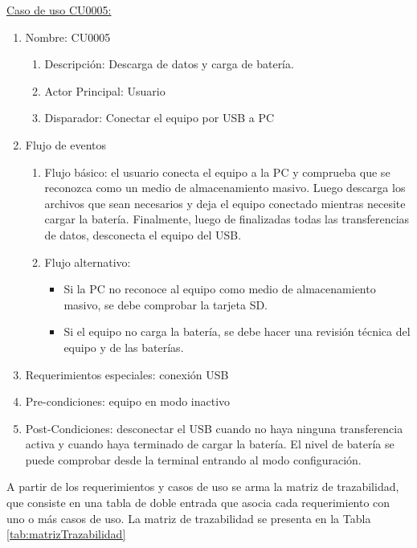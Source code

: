 	\underline{Caso de uso CU0005:}

	\begin{enumerate} 
		\item Nombre: CU0005
		\begin{enumerate} [label*=\arabic*.]
			\item Descripción: Descarga de datos y carga de batería.
			\item Actor Principal: Usuario
			\item Disparador: Conectar el equipo por USB a PC
		\end{enumerate}
		\item Flujo de eventos
		\begin{enumerate} [label*=\arabic*.]
			\item Flujo básico: el usuario conecta el equipo a la PC y comprueba que se reconozca como un medio de almacenamiento masivo. Luego descarga los archivos que sean necesarios y deja el equipo conectado mientras necesite cargar la batería. Finalmente, luego de finalizadas todas las transferencias de datos, desconecta el equipo del USB.
			\item Flujo alternativo:
			\begin{itemize}
				\item Si la PC no reconoce al equipo como medio de almacenamiento masivo, se debe comprobar la tarjeta SD.
				\item Si el equipo no carga la batería, se debe hacer una revisión técnica del equipo y de las baterías.			
			\end{itemize}				
		\end{enumerate}

		\item Requerimientos especiales: conexión USB
		\item Pre-condiciones: equipo en modo inactivo
		\item Post-Condiciones: desconectar el USB cuando no haya ninguna transferencia activa y cuando haya terminado de cargar la batería. El nivel de batería se puede comprobar desde la terminal entrando al modo configuración.
	\end{enumerate}
	
A partir de los requerimientos y casos de uso se arma la matriz de trazabilidad, que consiste en una tabla de doble entrada que asocia cada requerimiento con uno o más casos de uso. La matriz de trazabilidad se presenta en la Tabla \ref{tab:matrizTrazabilidad}

\footnotesize

